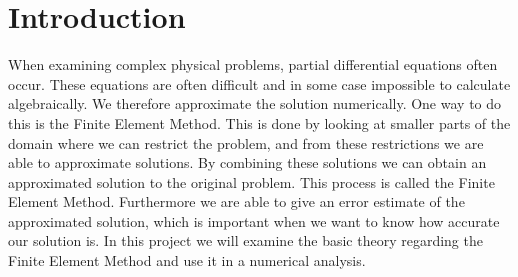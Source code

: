 \chapter{Introduction}
When examining complex physical problems, partial differential equations often occur. 
These equations are often difficult and in some case impossible to calculate algebraically.
We therefore approximate the solution numerically.
One way to do this is the Finite Element Method.
This is done by looking at smaller parts of the domain where we can restrict the problem,
and from these restrictions we are able to approximate solutions. 
By combining these solutions we can obtain an approximated solution to the original problem. 
This process is called the Finite Element Method.
Furthermore we are able to give an error estimate of the approximated solution, 
which is important when we want to know how accurate our solution is.
In this project we will examine the basic theory regarding the Finite Element Method and 
use it in a numerical analysis.